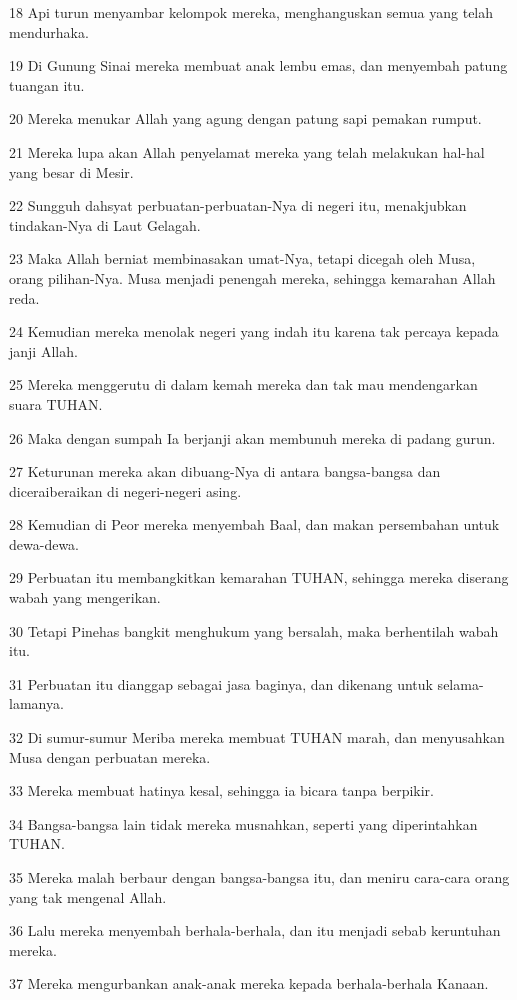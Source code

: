 \par 18 Api turun menyambar kelompok mereka, menghanguskan semua yang telah mendurhaka.
\par 19 Di Gunung Sinai mereka membuat anak lembu emas, dan menyembah patung tuangan itu.
\par 20 Mereka menukar Allah yang agung dengan patung sapi pemakan rumput.
\par 21 Mereka lupa akan Allah penyelamat mereka yang telah melakukan hal-hal yang besar di Mesir.
\par 22 Sungguh dahsyat perbuatan-perbuatan-Nya di negeri itu, menakjubkan tindakan-Nya di Laut Gelagah.
\par 23 Maka Allah berniat membinasakan umat-Nya, tetapi dicegah oleh Musa, orang pilihan-Nya. Musa menjadi penengah mereka, sehingga kemarahan Allah reda.
\par 24 Kemudian mereka menolak negeri yang indah itu karena tak percaya kepada janji Allah.
\par 25 Mereka menggerutu di dalam kemah mereka dan tak mau mendengarkan suara TUHAN.
\par 26 Maka dengan sumpah Ia berjanji akan membunuh mereka di padang gurun.
\par 27 Keturunan mereka akan dibuang-Nya di antara bangsa-bangsa dan diceraiberaikan di negeri-negeri asing.
\par 28 Kemudian di Peor mereka menyembah Baal, dan makan persembahan untuk dewa-dewa.
\par 29 Perbuatan itu membangkitkan kemarahan TUHAN, sehingga mereka diserang wabah yang mengerikan.
\par 30 Tetapi Pinehas bangkit menghukum yang bersalah, maka berhentilah wabah itu.
\par 31 Perbuatan itu dianggap sebagai jasa baginya, dan dikenang untuk selama-lamanya.
\par 32 Di sumur-sumur Meriba mereka membuat TUHAN marah, dan menyusahkan Musa dengan perbuatan mereka.
\par 33 Mereka membuat hatinya kesal, sehingga ia bicara tanpa berpikir.
\par 34 Bangsa-bangsa lain tidak mereka musnahkan, seperti yang diperintahkan TUHAN.
\par 35 Mereka malah berbaur dengan bangsa-bangsa itu, dan meniru cara-cara orang yang tak mengenal Allah.
\par 36 Lalu mereka menyembah berhala-berhala, dan itu menjadi sebab keruntuhan mereka.
\par 37 Mereka mengurbankan anak-anak mereka kepada berhala-berhala Kanaan.

